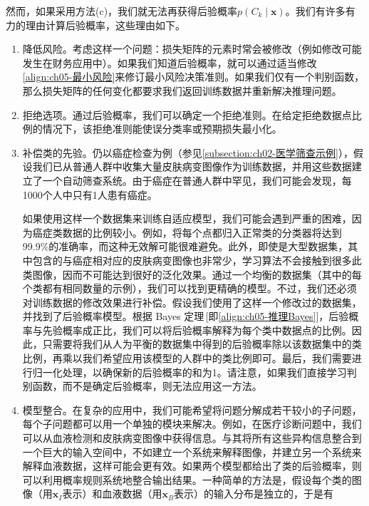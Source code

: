 \documentclass[../../main.tex]{subfiles}
\begin{document}
然而，如果采用方法(c)，我们就无法再获得后验概率$p(C_k\mid\boldsymbol{x})$。我们有许多有力的理由计算后验概率，这些理由如下。

\begin{enumerate}[(1)]
  \item 降低风险。考虑这样一个问题：损失矩阵的元素时常会被修改（例如修改可能发生在财务应用中）。如果我们知道后验概率，就可以通过适当修改\eqref{align:ch05-最小风险}来修订最小风险决策准则。如果我们仅有一个判别函数，那么损失矩阵的任何变化都要求我们返回训练数据并重新解决推理问题。

  \item 拒绝选项。通过后验概率，我们可以确定一个拒绝准则。在给定拒绝数据点比例的情况下，该拒绝准则能使误分类率或预期损失最小化。

  \item 补偿类的先验。仍以癌症检查为例（参见\cref{subsection:ch02-医学筛查示例}），假设我们已从普通人群中收集大量皮肤病变图像作为训练数据，并用这些数据建立了一个自动筛查系统。由于癌症在普通人群中罕见，我们可能会发现，每1000个人中只有1人患有癌症。

  如果使用这样一个数据集来训练自适应模型，我们可能会遇到严重的困难，因为癌症类数据的比例较小。例如，将每个点都归入正常类的分类器将达到99.9\%的准确率，而这种无效解可能很难避免。此外，即使是大型数据集，其中包含的与癌症相对应的皮肤病变图像也非常少，学习算法不会接触到很多此类图像，因而不可能达到很好的泛化效果。通过一个均衡的数据集（其中的每个类都有相同数量的示例），我们可以找到更精确的模型。不过，我们还必须对训练数据的修改效果进行补偿。假设我们使用了这样一个修改过的数据集，并找到了后验概率模型。根据 Bayes 定理\,[即\eqref{align:ch05-推理Bayes}]，后验概率与先验概率成正比，我们可以将后验概率解释为每个类中数据点的比例。因此，只需要将我们从人为平衡的数据集中得到的后验概率除以该数据集中的类比例，再乘以我们希望应用该模型的人群中的类比例即可。最后，我们需要进行归一化处理，以确保新的后验概率的和为1。请注意，如果我们直接学习判别函数，而不是确定后验概率，则无法应用这一方法。

  \item 模型整合。在复杂的应用中，我们可能希望将问题分解成若干较小的子问题，每个子问题都可以用一个单独的模块来解决。例如，在医疗诊断问题中，我们可以从血液检测和皮肤病变图像中获得信息。与其将所有这些异构信息整合到一个巨大的输入空间中，不如建立一个系统来解释图像，并建立另一个系统来解释血液数据，这样可能会更有效。如果两个模型都给出了类的后验概率，则可以利用概率规则系统地整合输出结果。一种简单的方法是，假设每个类的图像（用$\boldsymbol{x}_{I}$表示）和血液数据（用$\boldsymbol{x}_{B}$表示）的输入分布是独立的，于是有


\end{enumerate}
\end{document}
